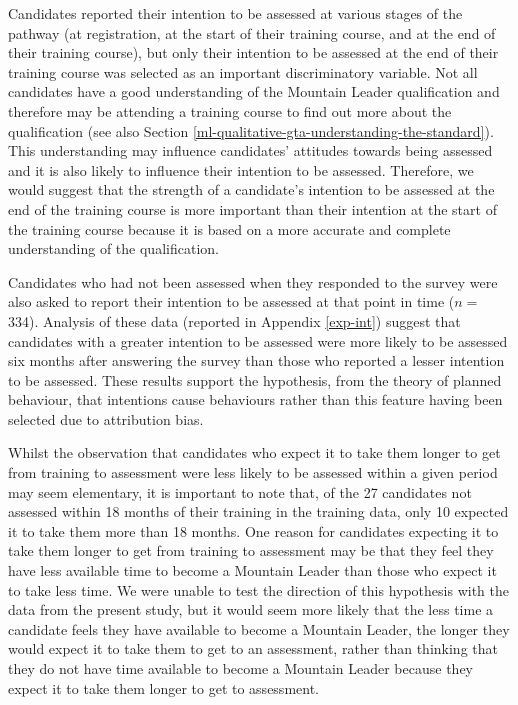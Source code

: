 \documentclass[
  12pt,
  a4paper,
]{book}
\begin{document}
Candidates reported their intention to be assessed at various stages of the pathway (at registration, at the start of their training course, and at the end of their training course), but only their intention to be assessed at the end of their training course was selected as an important discriminatory variable. Not all candidates have a good understanding of the Mountain Leader qualification and therefore may be attending a training course to find out more about the qualification (see also Section \ref{ml-qualitative-gta-understanding-the-standard}). This understanding may influence candidates' attitudes towards being assessed and it is also likely to influence their intention to be assessed. Therefore, we would suggest that the strength of a candidate's intention to be assessed at the end of the training course is more important than their intention at the start of the training course because it is based on a more accurate and complete understanding of the qualification.

Candidates who had not been assessed when they responded to the survey were also asked to report their intention to be assessed at that point in time (\(n =\) 334). Analysis of these data (reported in Appendix \ref{exp-int}) suggest that candidates with a greater intention to be assessed were more likely to be assessed six months after answering the survey than those who reported a lesser intention to be assessed. These results support the hypothesis, from the theory of planned behaviour, that intentions cause behaviours rather than this feature having been selected due to attribution bias.

Whilst the observation that candidates who expect it to take them longer to get from training to assessment were less likely to be assessed within a given period may seem elementary, it is important to note that, of the 27 candidates not assessed within 18 months of their training in the training data, only 10 expected it to take them more than 18 months. One reason for candidates expecting it to take them longer to get from training to assessment may be that they feel they have less available time to become a Mountain Leader than those who expect it to take less time. We were unable to test the direction of this hypothesis with the data from the present study, but it would seem more likely that the less time a candidate feels they have available to become a Mountain Leader, the longer they would expect it to take them to get to an assessment, rather than thinking that they do not have time available to become a Mountain Leader because they expect it to take them longer to get to assessment.
\end{document}
